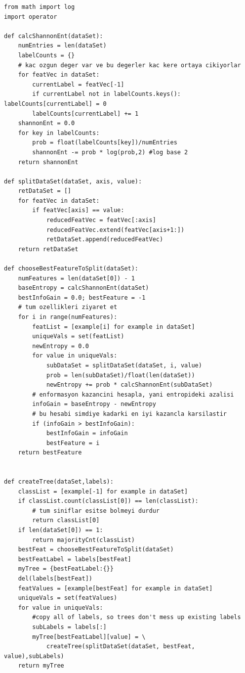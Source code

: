 \documentclass[12pt,fleqn]{article}\usepackage{../../common}
\begin{document}
\begin{verbatim}
from math import log
import operator

def calcShannonEnt(dataSet):
    numEntries = len(dataSet)
    labelCounts = {}
    # kac ozgun deger var ve bu degerler kac kere ortaya cikiyorlar
    for featVec in dataSet: 
        currentLabel = featVec[-1]
        if currentLabel not in labelCounts.keys(): labelCounts[currentLabel] = 0
        labelCounts[currentLabel] += 1
    shannonEnt = 0.0
    for key in labelCounts:
        prob = float(labelCounts[key])/numEntries
        shannonEnt -= prob * log(prob,2) #log base 2
    return shannonEnt
    
def splitDataSet(dataSet, axis, value):
    retDataSet = []
    for featVec in dataSet:
        if featVec[axis] == value:
            reducedFeatVec = featVec[:axis]     
            reducedFeatVec.extend(featVec[axis+1:])
            retDataSet.append(reducedFeatVec)
    return retDataSet
    
def chooseBestFeatureToSplit(dataSet):
    numFeatures = len(dataSet[0]) - 1      
    baseEntropy = calcShannonEnt(dataSet)
    bestInfoGain = 0.0; bestFeature = -1
    # tum ozellikleri ziyaret et
    for i in range(numFeatures):        
        featList = [example[i] for example in dataSet]
        uniqueVals = set(featList)       
        newEntropy = 0.0
        for value in uniqueVals:
            subDataSet = splitDataSet(dataSet, i, value)
            prob = len(subDataSet)/float(len(dataSet))
            newEntropy += prob * calcShannonEnt(subDataSet)     
        # enformasyon kazancini hesapla, yani entropideki azalisi
        infoGain = baseEntropy - newEntropy     
        # bu hesabi simdiye kadarki en iyi kazancla karsilastir
        if (infoGain > bestInfoGain):       
            bestInfoGain = infoGain         
            bestFeature = i
    return bestFeature                      


def createTree(dataSet,labels):
    classList = [example[-1] for example in dataSet]
    if classList.count(classList[0]) == len(classList): 
        # tum siniflar esitse bolmeyi durdur
        return classList[0]
    if len(dataSet[0]) == 1: 
        return majorityCnt(classList)
    bestFeat = chooseBestFeatureToSplit(dataSet)
    bestFeatLabel = labels[bestFeat]
    myTree = {bestFeatLabel:{}}
    del(labels[bestFeat])
    featValues = [example[bestFeat] for example in dataSet]
    uniqueVals = set(featValues)
    for value in uniqueVals:
        #copy all of labels, so trees don't mess up existing labels
        subLabels = labels[:]       
        myTree[bestFeatLabel][value] = \
            createTree(splitDataSet(dataSet, bestFeat, value),subLabels)
    return myTree                            


\end{verbatim}
\end{document}
